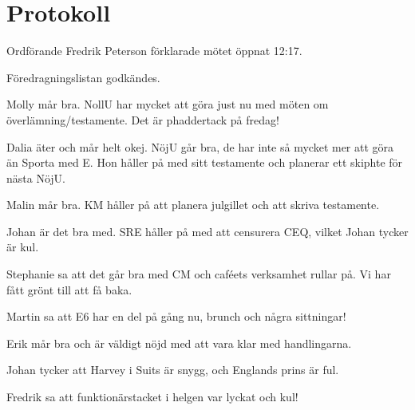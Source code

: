 \documentclass[10pt]{article}
\def\mo{Fredrik Peterson}
\begin{document}
\section*{Protokoll}
\begin{paragrafer}
Ordförande {\mo} förklarade mötet öppnat 12:17.

{\valavmo}

{\valavms}

{\tosg}

{\ingaadj}

{\valavj}

Föredragningslistan godkändes.


\begin{fyllnadsval} %
\end{fyllnadsval}

\begin{paragrafer}
Molly mår bra. NollU har mycket att göra just nu med möten om överlämning/testamente. Det är phaddertack på fredag!

Dalia äter och mår helt okej. NöjU går bra, de har inte så mycket mer att göra än Sporta med E. Hon håller på med sitt testamente och planerar ett skiphte för nästa NöjU.

Malin mår bra. KM håller på att planera julgillet och att skriva testamente.

Johan är det bra med. SRE håller på med att censurera CEQ, vilket Johan tycker är kul.

Stephanie sa att det går bra med CM och caféets verksamhet rullar på. Vi har fått grönt till att få baka.

Martin sa att E6 har en del på gång nu, brunch och några sittningar!

Erik mår bra och är väldigt nöjd med att vara klar med handlingarna.

Johan tycker att Harvey i Suits är snygg, och Englands prins är ful.

Fredrik sa att funktionärstacket i helgen var lyckat och kul!


\end{paragrafer}
\end{paragrafer}
\end{document}
